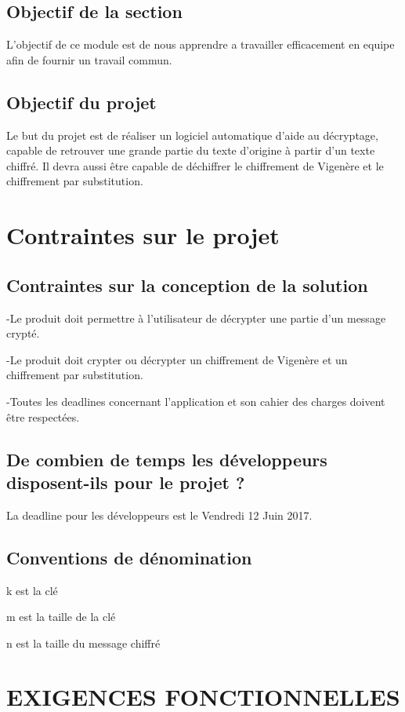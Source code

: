 \documentclass[a4]{article}
\begin{document}
			\subsection{Objectif de la section}
				L'objectif de ce module est de nous apprendre a travailler efficacement en equipe afin de fournir un travail commun.
			\subsection{Objectif du projet}
				Le but du projet est de réaliser un logiciel automatique d'aide au décryptage, capable de retrouver une grande partie du texte d'origine à partir d'un texte chiffré. Il devra aussi être capable de déchiffrer le chiffrement de Vigenère et le chiffrement par substitution.
\section{Contraintes sur le projet}
			\subsection{Contraintes sur la conception de la solution}
				-Le produit doit permettre à l'utilisateur de décrypter une partie d'un message crypté.

				-Le produit doit crypter ou décrypter un chiffrement de Vigenère et un chiffrement par substitution.

				-Toutes les deadlines concernant l'application et son cahier des charges doivent être respectées.
			\subsection{ De combien de temps les développeurs disposent-ils pour le projet ?}
				La deadline pour les développeurs est le Vendredi 12 Juin 2017.
		\subsection{Conventions de dénomination}
		
			k est la clé

			m est la taille de la clé

			n est la taille du message chiffré

	\section{EXIGENCES FONCTIONNELLES}
\end{document}
